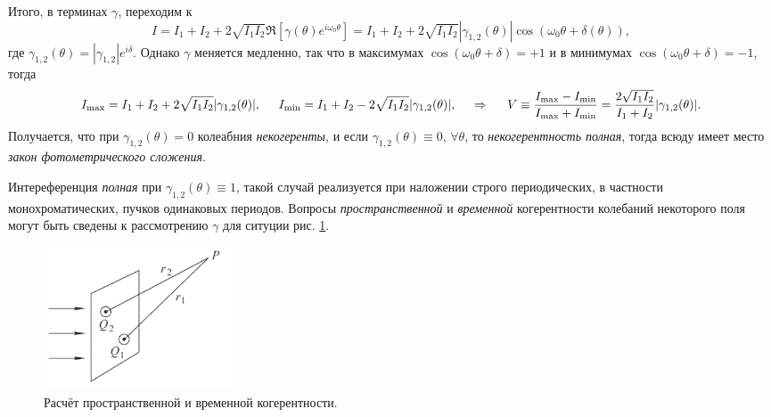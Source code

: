 Итого, в терминах $\gamma$, переходим к
\begin{equation*}
    I = I_1 + I_2 + 2 \sqrt{I_1 I_2} \Re\left[\gamma(\theta) e^{i \omega_0 \theta}\right] = 
    I_1 + I_2 + 2 \sqrt{I_1 I_2}  |\gamma_{1,2}(\theta)| \cos(\omega_0 \theta + \delta(\theta)),
\end{equation*}
где $\gamma_{1,2} (\theta) = |\gamma_{1, 2}|e^{i \delta}$. Однако $\gamma$ меняется медленно, так что в максимумах $\cos(\omega_0 \theta + \delta) = +1$ и в минимумах $\cos(\omega_0 \theta + \delta) = -1$, тогда
\begin{equation*}
    I_{\textnormal{max}} = I_1 + I_2 + 2 \sqrt{I_1 I_2} |\gamma_{1, 2} (\theta)|,
    \hspace{5 mm} 
    I_{\textnormal{min}} = I_1 + I_2 - 2 \sqrt{I_1 I_2} |\gamma_{1, 2} (\theta)|,
    \hspace{0.5cm} \Rightarrow \hspace{0.5cm}
    V \equiv \frac{I_{\textnormal{max}}-I_{\textnormal{min}}}{I_{\textnormal{max}}+I_{\textnormal{min}}} = \frac{2 \sqrt{I_1 I_2}}{I_1 + I_2} |\gamma_{1,2} (\theta)|.
\end{equation*}
Получается, что при $\gamma_{1, 2}(\theta) =0$ колеабния \textit{некогеренты}, и если $\gamma_{1, 2}(\theta) \equiv 0,\, \forall \theta$, то \textit{некогерентность полная}, тогда всюду имеет место \textit{закон фотометрического сложения}. 

Интереференция \textit{полная} при $\gamma_{1, 2}(\theta) \equiv 1$, такой случай реализуется при наложении строго
периодических, в частности монохроматических, пучков одинаковых периодов. Вопросы \textit{пространственной} и \textit{временной} когерентности колебаний некоторого поля могут быть сведены к рассмотрению $\gamma$ для ситуции рис. \ref{fig:31}.
\begin{figure}[h]
    \centering
    \includegraphics[width=0.27\textwidth]{figures/31_1.png}
    \caption{Расчёт пространственной и временной когерентности.}
    \label{fig:31}
\end{figure}


